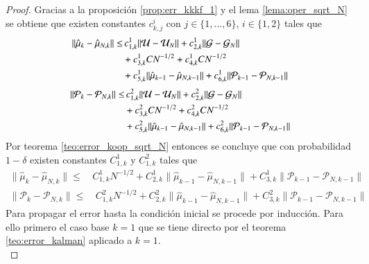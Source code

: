 \begin{proof}
	Gracias a la proposición \ref{prop:err_kkkf_1} y el lema \ref{lema:oper_sqrt_N} se obtiene que existen constantes $c_{k,j}^i$ con $j \in \{ 1, \dots, 6\}$, $i \in \{ 1, 2\}$ tales que
	\begin{equation*}
		\begin{aligned}
			\| \hat \mu_{k} - \hat \mu_{N,k}  \| \leq & \, c_{1,k}^1 \| \mathcal{U} - \mathcal{U}_N \| +  c_{2,k}^1 \| \mathcal{G} - \mathcal{G}_N \| \\ 
			&+ c_{3,k}^1 C N^{-1/2}+c_{4,k}^1 C N^{-1/2} \\
			& + c_{5,k}^1 \| \hat \mu_{k-1} - \hat \mu_{N, k-1} \| + c_{6,k}^1 \| \mathcal{P}_{k-1} - \mathcal{P}_{N, k-1} \|
		\end{aligned}
		\label{}
	\end{equation*}
	\begin{equation*}
		\begin{aligned}
			\| \mathcal{P}_{k} - \mathcal{P}_{N,k} \| \leq & \, c_{1,k}^2 \| \mathcal{U} - \mathcal{U}_N \| +  c_{2,k}^2 \| \mathcal{G} - \mathcal{G}_N \| \\ 
			&+ c_{3,k}^2 C N^{-1/2}+c_{4,k}^2 C N^{-1/2} \\
			& + c_{5,k}^2 \| \hat \mu_{k-1} - \hat \mu_{N, k-1} \| + c_{6,k}^2 \| \mathcal{P}_{k-1} - \mathcal{P}_{N, k-1} \|
		\end{aligned}
	\end{equation*}
	Por teorema \ref{teo:error_koop_sqrt_N} entonces se concluye que con probabilidad $1-\delta$ existen constantes $C^1_{1, k}$ y $C^2_{1, k}$ tales que
	\begin{equation*}
		\begin{aligned}
			\| \hat \mu_{k} - \hat \mu_{N,k}  \| \leq & \, C_{1,k}^1 N^{-1/2} + C_{2,k}^1 \| \hat \mu_{k-1} - \hat \mu_{N, k-1} \| + C_{3,k}^1 \| \mathcal{P}_{k-1}  - \mathcal{P}_{N, k-1}  \|
		\end{aligned}
	\end{equation*}
	\begin{equation*}
		\begin{aligned}
			\| \mathcal{P}_{k} - \mathcal{P}_{N,k}  \| \leq & \, C_{1,k}^2 N^{-1/2} + C_{2,k}^2 \| \hat \mu_{k-1} - \hat \mu_{N, k-1} \| + C_{3,k}^2 \| \mathcal{P}_{k-1} - \mathcal{P}_{N,k-1} \|
		\end{aligned}
	\end{equation*}
	Para propagar el error hasta la condición inicial se procede por inducción. Para ello primero el caso base $k=1$ que se tiene directo por el teorema \ref{teo:error_kalman} aplicado a $k=1$.\\

\end{proof}
